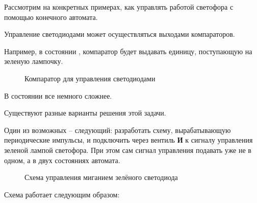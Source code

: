 \par{Рассмотрим на конкретных примерах, как управлять работой светофора с помощью конечного автомата.}

\par{Управление светодиодами может осуществляться выходами компараторов.}

\par{Например, в состоянии , компаратор будет выдавать единицу, поступающую на зеленую лампочку.}

\begin{figure}[H]
  \centering
  \def\svgwidth{\columnwidth}
  
  \caption{Компаратор для управления светодиодами}
\end{figure}

\par{В состоянии  все немного сложнее.}

\par{Существуют разные варианты решения этой задачи.}

\par{Один из возможных – следующий: разработать схему, вырабатывающую периодические импульсы, и подключить через вентиль \textbf{И} к сигналу управления зеленой лампой светофора. При этом сам сигнал управления подавать уже не в одном, а в двух состояниях автомата.}

\begin{figure}[H]
  \centering
  \def\svgwidth{\columnwidth}
  
  \caption{Схема управления миганием зелёного светодиода}
\end{figure}

\par{Схема работает следующим образом:}

